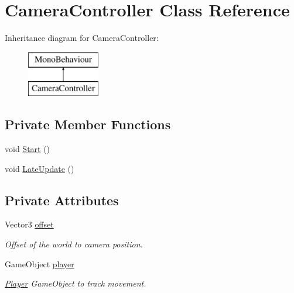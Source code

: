\hypertarget{class_camera_controller}{}\section{Camera\+Controller Class Reference}
\label{class_camera_controller}
Inheritance diagram for Camera\+Controller\+:\begin{figure}[H]
\begin{center}
\leavevmode
\includegraphics[height=2.000000cm]{class_camera_controller}
\end{center}
\end{figure}
\subsection*{Private Member Functions}
\begin{DoxyCompactItemize}
\item 
void \hyperlink{class_camera_controller_ad4a238c6f7db3ee003302a245d860860}{Start} ()
\item 
void \hyperlink{class_camera_controller_afcd241727886518c21b9609193e32d18}{Late\+Update} ()
\end{DoxyCompactItemize}
\subsection*{Private Attributes}
\begin{DoxyCompactItemize}
\item 
\mbox{\label{class_camera_controller_aff80d2275dae360196361c39078bfda4}} 
Vector3 \hyperlink{class_camera_controller_aff80d2275dae360196361c39078bfda4}{offset}
\begin{DoxyCompactList}\small\item\em Offset of the world to camera position. \end{DoxyCompactList}\item 
\mbox{\label{class_camera_controller_aae794ec2d17947f671ce0eaef9aac8b7}} 
Game\+Object \hyperlink{class_camera_controller_aae794ec2d17947f671ce0eaef9aac8b7}{player}
\begin{DoxyCompactList}\small\item\em \hyperlink{class_player}{Player} Game\+Object to track movement. \end{DoxyCompactList}\end{DoxyCompactItemize}


